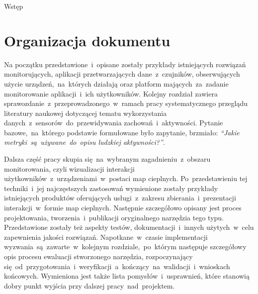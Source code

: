 \begin{chapter}{Wstęp}
	\section{Organizacja dokumentu}
	Na początku przedstawione~i~opisane zostały przykłady istniejących rozwiązań monitorujących, aplikacji przetwarzających dane~z~czujników, obserwujących użycie urządzeń,~na~których działają oraz platform mających~za~zadanie monitorowanie aplikacji~i~ich użytkowników. Kolejny rozdział zawiera sprawozdanie~z~przeprowadzonego~w~ramach pracy systematycznego przeglądu literatury naukowej dotyczącej tematu wykorzystania danych~z~sensorów~do~przewidywania zachowań~i~aktywności. Pytanie bazowe,~na~którego podstawie formułowane było zapytanie, brzmiało: {\it ``Jakie metryki~są~używane~do~opisu ludzkiej aktywności?''}. 
	
	Dalsza część pracy skupia się~na~wybranym zagadnieniu~z~obszaru monitorowania, czyli wizualizacji interakcji użytkowników~z~urządzeniami~w~postaci map cieplnych. Po~przedstawieniu tej techniki~i~jej najczęstszych zastosowań wymienione zostały przykłady istniejących produktów oferujących usługi~z~zakresu zbierania~i~prezentacji interakcji~w~formie map cieplnych. Następnie szczegółowo opisany jest proces projektowania, tworzenia~i~publikacji oryginalnego narzędzia tego typu. Przedstawione zostały też aspekty testów, dokumentacji~i~innych użytych~w~celu zapewnienia jakości rozwiązań. Napotkane~w~czasie implementacji wyzwania~są~zawarte~w~kolejnym rozdziale,~po~którym następuje szczegółowy opis procesu ewaluacji stworzonego narzędzia, rozpoczynający się~od~przygotowania~i~weryfikacji~a~kończący~na~walidacji~i~wnioskach końcowych. Wymieniona jest także lista pomysłów~i~usprawnień, które stanowią dobry punkt wyjścia przy dalszej pracy~nad~projektem.
\end{chapter}
